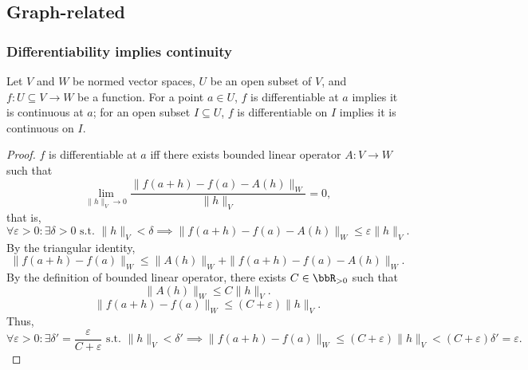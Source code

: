 \subsection{Graph-related}
\subsubsection{Differentiability implies continuity}
Let $V$ and $W$ be normed vector spaces, $U$ be an open subset of $V$, and $f\colon U\subseteq V\to W$ be a function. For a point $a\in U$, $f$ is differentiable at $a$ implies it is continuous at $a$; for an open subset $I\subseteq U$, $f$ is differentiable on $I$ implies it is continuous on $I$.
\begin{proof}
$f$ is differentiable at $a$ iff there exists bounded linear operator $A\colon V\to W$ such that
\[\lim_{\|h\|_V\to 0}\frac{\|f(a+h)-f(a)-A(h)\|_W}{\|h\|_V}=0,\]
that is,
\[\forall\varepsilon>0\colon\exists\delta>0\text{\ s.t.\ }\|h\|_V<\delta\implies\|f(a+h)-f(a)-A(h)\|_W\leq\varepsilon\|h\|_V.\]
By the triangular identity,
\[\|f(a+h)-f(a)\|_W\leq\|A(h)\|_W+\|f(a+h)-f(a)-A(h)\|_W.\]
By the definition of bounded linear operator, there exists $C\in\bbR_{>0}$ such that
\[\|A(h)\|_W\leq C\|h\|_V.\]
\[\|f(a+h)-f(a)\|_W\leq (C+\varepsilon)\|h\|_V.\]
Thus,
\[\forall\varepsilon>0\colon\exists\delta'=\frac{\varepsilon}{C+\varepsilon}\text{\ s.t.\ }\|h\|_V<\delta'\implies\|f(a+h)-f(a)\|_W\leq(C+\varepsilon)\|h\|_V<(C+\varepsilon)\delta'=\varepsilon.\]
\end{proof}
